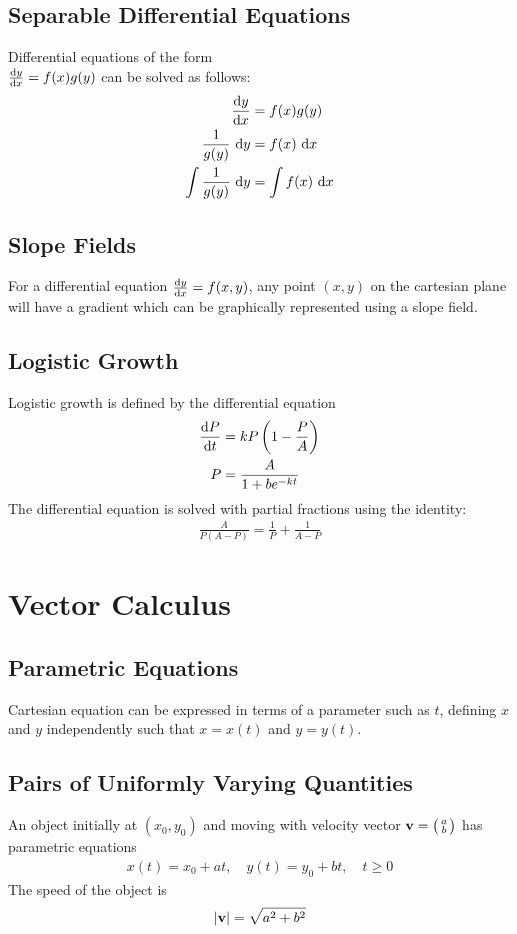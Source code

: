 \documentclass[10pt, a4paper, titlepage]{article}
\begin{document}
\begin{multicols*}{3}
	\dotfill
	\subsection{Separable Differential Equations}
	Differential equations of the form \\$\dv{y}{x}=f(x)g(y)$ can be solved as follows:
	\begin{align}
		\dv{y}{x}&=f(x)g(y)\\
		\frac{1}{g(y)}\, \dd{y}&=f(x)\, \dd{x}\\
		\int \frac{1}{g(y)}\, \dd{y}&=\int f(x)\, \dd{x}
	\end{align}

	\dotfill
	\subsection{Slope Fields}
	For a differential equation $\dv{y}{x}=f(x,y)$, any point $(x,y)$ on the cartesian plane will have a gradient which can be graphically represented using a slope field.

	\dotfill
	\subsection{Logistic Growth}
	Logistic growth is defined by the differential equation
	\begin{align}
		\dv{P}{t}&=kP\left(1-\frac{P}{A}\right)\\
		P&=\frac{A}{1+be^{-kt}}
	\end{align}
	The differential equation is solved with partial fractions using the identity:
	\begin{align}
		\frac{A}{P(A-P)}=\frac{1}{P}+\frac{1}{A-P}
	\end{align}
	
	\hrulefill

	\section{Vector Calculus}
	\subsection{Parametric Equations}
	Cartesian equation can be expressed in terms of a parameter such as $t$, defining $x$ and $y$ independently such that $x=x(t)$ and $y=y(t)$.

	\dotfill
	\subsection{Pairs of Uniformly Varying Quantities}
	An object initially at $(x_0,y_0)$ and moving with velocity vector $\vb{v}=\big(\begin{smallmatrix}a \\b \end{smallmatrix}\big)$ has parametric equations
	\begin{align}
		x(t)=x_0+at,\quad y(t)=y_0+bt,\quad t\geq 0
	\end{align}
	The speed of the object is
	\begin{align}
		|\vb{v}|=\sqrt{a^2+b^2}
	\end{align}


\end{multicols*}
\end{document}
